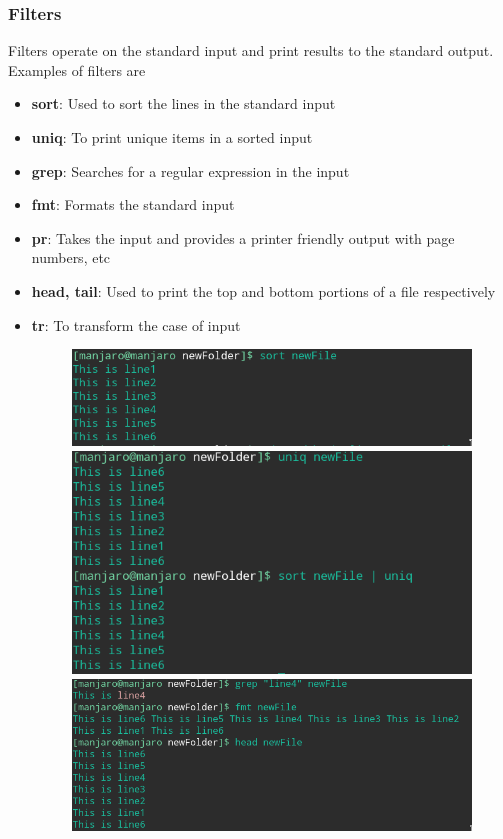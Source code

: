 \documentclass{article}
\begin{document}
\subsubsection{Filters}
Filters operate on the standard input and print results to the standard output. Examples of filters are
\begin{itemize}
    \item {\bf sort}: Used to sort the lines in the standard input\newline
    \item {\bf uniq}: To print unique items in a sorted input\newline
    \item {\bf grep}: Searches for a regular expression in the input\newline
    \item {\bf fmt}: Formats the standard input\newline
    \item {\bf pr}: Takes the input and provides a printer friendly output with page numbers, etc\newline
    \item {\bf head, tail}: Used to print the top and bottom portions of a file respectively\newline
    \item {\bf tr}: To transform the case of input\newline
    \begin{figure}[h!]
        \centering
        \includegraphics[width=.80\textwidth]{img/p2/ss5.png}
         \includegraphics[width=.80\textwidth]{img/p2/ss6.png}
         \includegraphics[width=.80\textwidth]{img/p2/ss7.png}

\end{figure}
\end{itemize}
\end{document}
